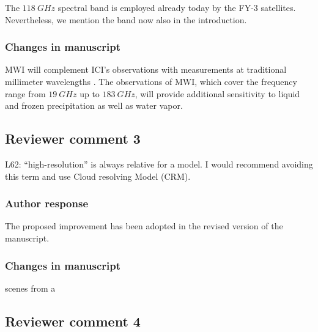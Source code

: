 The $118\ \unit{GHz}$ spectral band is employed already today by the FY-3
satellites. Nevertheless, we mention the band now also in the introduction.

\subsubsection*{Changes in manuscript}

\begin{change}[63]
 MWI will complement ICI's observations with measurements at traditional
 millimeter wavelengths \DIFaddbegin {}\DIFaddend . The observations of MWI, which
 cover the frequency range from $19\ \unit{GHz}$ up to $183\ \unit{GHz}$, will
 provide additional sensitivity to liquid and frozen precipitation as well as
 water vapor.
\end{change}

\subsection*{Reviewer comment 3}

L62: “high-resolution” is always relative for a model. I would recommend avoiding this term and use Cloud resolving Model (CRM).

\subsubsection*{Author response}

The proposed improvement has been adopted in the revised version of the manuscript.


\subsubsection{Changes in manuscript}

\begin{change}[74]
  \DIFaddbegin {}\DIFaddend scenes from a
  \DIFdelbegin {}\DIFdelend \DIFaddbegin {}\DIFaddend
\end{change}


\subsection*{Reviewer comment 4}

